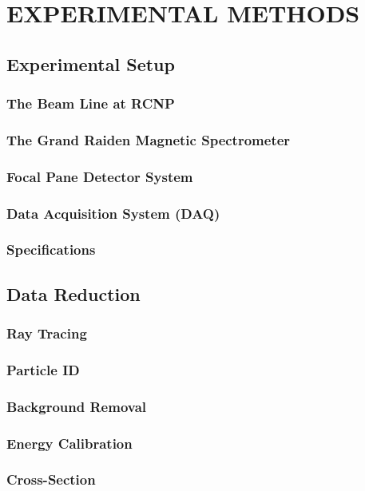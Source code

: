 %
%

\chapter{EXPERIMENTAL METHODS}
\label{chp:exp-li}

\section{Experimental Setup}
\label{sec:exp-li-setup}
\subsection{The Beam Line at RCNP}
\label{ssec:exp-li-setup-beam-line}
\subsection{The Grand Raiden Magnetic Spectrometer}
\label{ssec:exp-li-setup-grand-raiden}
\subsection{Focal Pane Detector System}
\label{ssec:exp-li-setup-fp-dets}
\subsection{Data Acquisition System (DAQ)}
\label{ssec:exp-li-setup-daq}
\subsection{Specifications}
\label{ssec:exp-li-setup-specs}

\section{Data Reduction}
\label{sec:exp-li-data-red}
\subsection{Ray Tracing}
\label{ssec:exp-li-data-red-ray-trace}
\subsection{Particle ID}
\label{ssec:exp-li-data-red-pid}
\subsection{Background Removal}
\label{ssec:exp-li-data-red-bg-rm}
\subsection{Energy Calibration}
\label{ssec:exp-li-data-red-bg-en-cal}
\subsection{Cross-Section}
\label{ssec:exp-li-data-red-bg-cs}
